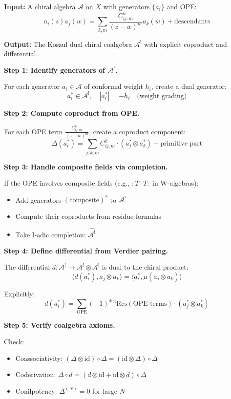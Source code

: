 \begin{algorithm}\label{alg:NAP-koszul}
\textbf{Input:} A chiral algebra $\mathcal{A}$ on $X$ with generators $\{a_i\}$ and OPE:
$$a_i(z) a_j(w) = \sum_{k, m} \frac{C^k_{ij,m}}{(z-w)^m} a_k(w) + \text{descendants}$$

\textbf{Output:} The Koszul dual chiral coalgebra $\mathcal{A}^!$ with explicit coproduct and differential.

\textbf{Step 1: Identify generators of $\mathcal{A}^!$.}

For each generator $a_i \in \mathcal{A}$ of conformal weight $h_i$, create a dual generator:
$$a_i^* \in \mathcal{A}^!, \quad |a_i^*| = -h_i \quad \text{(weight grading)}$$

\textbf{Step 2: Compute coproduct from OPE.}

For each OPE term $\frac{C^k_{ij,m}}{(z-w)^m}$, create a coproduct component:
$$\Delta(a_i^*) = \sum_{j,k,m} C^k_{ij,m} \cdot (a_j^* \otimes a_k^*) + \text{primitive part}$$

\textbf{Step 3: Handle composite fields via completion.}

If the OPE involves composite fields (e.g., $:T \cdot T:$ in W-algebras):
\begin{itemize}
\item Add generators $(\text{composite})^*$ to $\mathcal{A}^!$
\item Compute their coproducts from residue formulas
\item Take I-adic completion: $\widehat{\mathcal{A}^!}$
\end{itemize}

\textbf{Step 4: Define differential from Verdier pairing.}

The differential $d: \mathcal{A}^! \to \mathcal{A}^! \otimes \mathcal{A}^!$ is dual to the chiral product:
$$\langle d(a_i^*), a_j \otimes a_k \rangle = \langle a_i^*, \mu(a_j \otimes a_k) \rangle$$

Explicitly:
$$d(a_i^*) = \sum_{\text{OPE}} (-1)^{\deg} \text{Res}(\text{OPE terms}) \cdot (a_j^* \otimes a_k^*)$$

\textbf{Step 5: Verify coalgebra axioms.}

Check:
\begin{itemize}
\item Coassociativity: $(\Delta \otimes \text{id}) \circ \Delta = (\text{id} \otimes \Delta) \circ \Delta$
\item Coderivation: $\Delta \circ d = (d \otimes \text{id} + \text{id} \otimes d) \circ \Delta$
\item Conilpotency: $\Delta^{(N)} = 0$ for large $N$
\end{itemize}


\end{algorithm}
